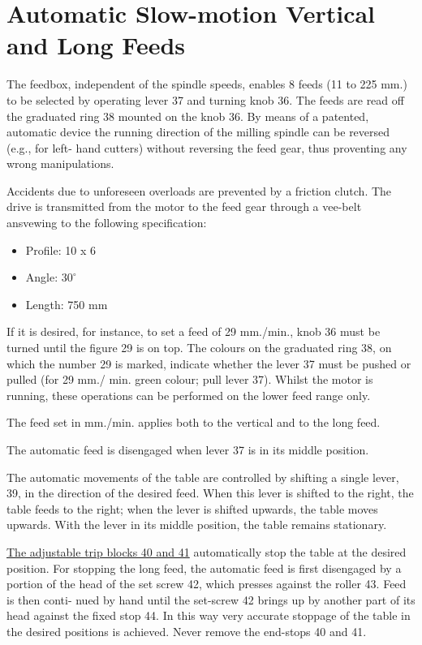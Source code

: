 \chapter{Automatic Slow-motion Vertical and Long Feeds}

The feedbox, independent of the spindle speeds, enables 8 feeds
(11 to 225 mm.) to be selected by operating lever 37 and turning
knob 36. The feeds are read off the graduated ring 38 mounted on
the knob 36. By means of a patented, automatic device the running
direction of the milling spindle can be reversed (e.g., for left-
hand cutters) without reversing the feed gear, thus proventing any
wrong manipulations.

Accidents due to unforeseen overloads are prevented by a friction
clutch. The drive is transmitted from the motor to the feed gear
through a vee-belt ansvewing to the following specification:

\begin{itemize}
    \item Profile: 10 x 6
    \item Angle: \(30^\circ\)
    \item Length: 750 mm
\end{itemize}

If it is desired, for instance, to set a feed of 29 mm./min.,
knob 36 must be turned until the figure 29 is on top. The colours
on the graduated ring 38, on which the number 29 is marked,
indicate whether the lever 37 must be pushed or pulled (for 29 mm./
min. green colour; pull lever 37). Whilst the motor is running,
these operations can be performed on the lower feed range only.

The feed set in mm./min. applies both to the vertical and to the
long feed.

The automatic feed is disengaged when lever 37 is in its middle
position.

The automatic movements of the table are controlled by shifting a
single lever, 39, in the direction of the desired feed. When this
lever is shifted to the right, the table feeds to the right; when
the lever is shifted upwards, the table moves upwards. With the
lever in its middle position, the table remains stationary.


\ul{The adjustable trip blocks 40 and 41} automatically stop the table
at the desired position. For stopping the long feed, the automatic
feed is first disengaged by a portion of the head of the set
screw 42, which presses against the roller 43. Feed is then conti-
nued by hand until the set-screw 42 brings up by another part of
its head against the fixed stop 44. In this way very accurate
stoppage of the table in the desired positions is achieved.
Never remove the end-stops 40 and 41.

